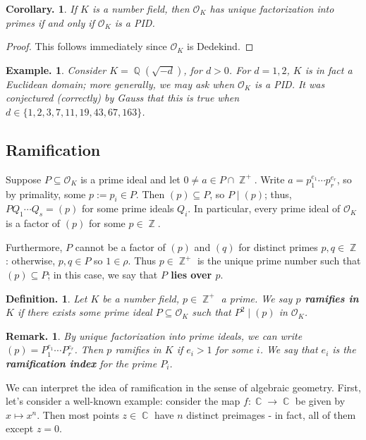 \documentclass[11pt, a4paper]{memoir}
\DeclareMathOperator{\Q}{{\mathbb{Q}}}
\DeclareMathOperator{\Z}{{\mathbb{Z}}}
\DeclareMathOperator{\C}{{\mathbb{C}}}
\theoremstyle{change}
\newtheorem{corollary}[theorem]{Corollary.}
\theoremstyle{plain}
\theoremstyle{nonumberplain}
\newtheorem{definition}{Definition.}
\newtheorem{example}{Example.}
\newtheorem{remark}{Remark.}
\newtheorem{proof}{Proof}
\newcommand{\mbf}[1]{{\boldmath\bfseries #1}}
\numberwithin{equation}{section}
\begin{document}
\begin{corollary}
    If $K$ is a number field, then $\mathcal{O}_K$ has unique factorization into primes if and only if $\mathcal{O}_K$ is a PID.
\end{corollary}
\begin{proof}
    This follows immediately since $\mathcal{O}_K$ is Dedekind.
\end{proof}
\begin{example}
    Consider $K=\Q(\sqrt{-d})$, for $d>0$.
    For $d=1,2$, $K$ is in fact a Euclidean domain; more generally, we may ask when $\mathcal{O}_K$ is a PID.
    It was conjectured (correctly) by Gauss that this is true when $d\in\{1,2,3,7,11,19,43,67,163\}$.
\end{example}
\subsection{Ramification}
Suppose $P\subseteq\mathcal{O}_K$ is a prime ideal and let $0\neq a\in P\cap\Z^+$.
Write $a=p_1^{e_1}\cdots p_r^{e_r}$, so by primality, some $p:=p_i\in P$.
Then $(p)\subseteq P$, so $P\mid(p)$; thus, $PQ_1\cdots Q_s=(p)$ for some prime ideals $Q_i$.
In particular, every prime ideal of $\mathcal{O}_K$ is a factor of $(p)$ for some $p\in\Z$.

Furthermore, $P$ cannot be a factor of $(p)$ and $(q)$ for distinct primes $p,q\in\Z$: otherwise, $p,q\in P$ so $1\in\rho$.
Thus $p\in \Z^+$ is the unique prime number such that $(p)\subseteq P$; in this case, we say that \mbf{$P$ lies over $p$}.
\begin{definition}
    Let $K$ be a number field, $p\in\Z^+$ a prime.
    We say \mbf{$p$ ramifies in $K$} if there exists some prime ideal $P\subseteq\mathcal{O}_K$ such that $P^2\mid(p)$ in $\mathcal{O}_K$.
\end{definition}
\begin{remark}
    By unique factorization into prime ideals, we can write $(p)=P_1^{e_1}\cdots P_r^{e_r}$.
    Then $p$ ramifies in $K$ if $e_i>1$ for some $i$.
    We say that $e_i$ is the \mbf{ramification index} for the prime $P_i$.

\end{remark}
We can interpret the idea of ramification in the sense of algebraic geometry.
First, let's consider a well-known example: consider the map $f:\C\to\C$ be given by $x\mapsto x^n$.
Then most points $z\in\C$ have $n$ distinct preimages - in fact, all of them except $z=0$.
\end{document}
